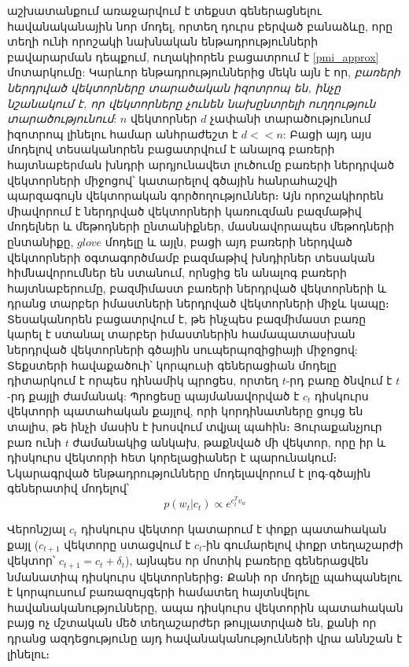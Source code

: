 \documentclass[11pt]{article}
\begin{document}
\cite{bib_item_14} աշխատանքում առաջարվում է տեքստ գեներացնելու հավանականային նոր մոդել, որտեղ դուրս բերված բանաձևը, որը տեղի ունի որոշակի նախնական ենթադրությունների բավարարման դեպքում,  ուղակիորեն  բացատրում է \ref{pmi_approx} մոտարկումը: Կարևոր ենթադրություններից մեկն այն է որ, \textit{բառերի ներդրված վեկտորները տարածական իզոտրոպ են, ինչը նշանակում է, որ վեկտորները չունեն նախընտրելի ուղղություն տարածությունում}: $n$ վեկտորներ $d$ չափանի տարածությունում իզոտրոպ լինելու համար անհրաժեշտ է $d << n$: Բացի այդ այս մոդելով տեսականորեն բացատրվում է անալոգ բառերի հայտնաբերման խնդրի  արդյունավետ լուծումը բառերի ներդրված վեկտորների միջոցով՝ կատարելով  գծային հանրահաշվի պարզագույն վեկտորական գործողություններ։ Այն որոշակիորեն միավորում է ներդրված վեկտորների կառուզման բազմաթիվ մոդելներ և մեթոդների ընտանիքներ, մասնավորապես  մեթոդների ընտանիքը, $glove$ մոդելը և այլն, բացի այդ բառերի ներդված վեկտորների օգտագործմամբ  բազմաթիվ խնդիրներ տեսական հիմնավորումներ են ստանում, որնցից են անալոգ բառերի հայտնաբերումը, բազմիմաստ բառերի ներդրված վեկտորների և դրանց տարբեր իմաստների ներդրված վեկտորների միջև կապը։ Տեսականորեն բացատրվում է, թե ինչպես բազմիմաստ բառը կարել է ստանալ տարբեր իմաստներին համապատասխան ներդրված վեկտորների գծային սուպերպոզիցիայի միջոցով: Տեքստերի  հավաքածուի՝ կորպուսի գեներացիան մոդելը դիտարկում է որպես դինամիկ պրոցես, որտեղ $t$-րդ բառը ծնվում է   $t$-րդ քայլի ժամանակ: Պրոցեսը պայմանավորված է $c_t$ դիսկուրս վեկտորի պատահական քայլով, որի կորդինատները ցույց են տալիս, թե ինչի մասին է խոսվում տվյալ պահին։ Յուրաքանչյուր բառ ունի $t$ ժամանակից անկախ, թաքնված մի  վեկտոր, որը իր և դիսկուրս վեկտորի հետ կորելացիաներ է պարունակում։ Նկարագրված ենթադրությունները մոդելավորում է լոգ-գծային գեներատիվ մոդելով՝
 \begin{equation}
 p \left (w_t | c_t \right ) \propto e ^{c^T_tv_w } 
 \label{gen_model_eq}
 \end{equation}
        \par Վերոնշյալ $c_t$ դիսկուրս վեկտոր  կատարում է փոքր պատահական քայլ ($c_{t+1}$ վեկտորը ստացվում է $c_t$-ին գումարելով փոքր տեղաշարժի վեկտոր՝ $c_{t+1} = c_t + \delta _t$), այնպես որ մոտիկ բառերը գեներացվեն նմանատիպ դիսկուրս վեկտորներից։ Քանի որ մոդելը պահպանելու է կորպուսում բառազույգերի համատեղ հայտնվելու հավանականությունները, ապա դիսկուրս վեկտորին պատահական բայց ոչ մշտական մեծ տեղաշարժեր թույլատրված են, քանի որ դրանց ազդեցությունը այդ հավանականությունների վրա աննշան է լինելու։ 
        
\end{document}
